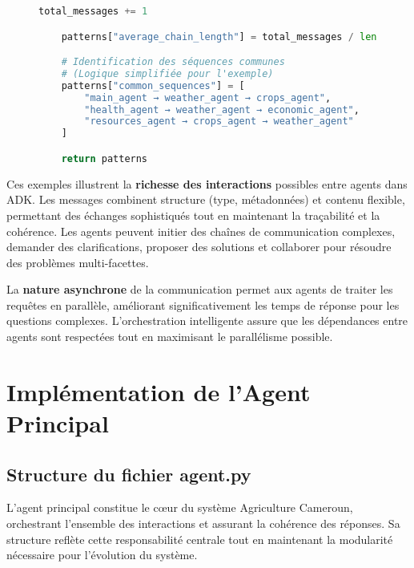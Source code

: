 \begin{figure}[H]
\begin{lstlisting}[language=Python, caption=Exemples de communications inter-agents en action]
            total_messages += 1

    patterns["average_chain_length"] = total_messages / len(scenarios)

    # Identification des séquences communes
    # (Logique simplifiée pour l'exemple)
    patterns["common_sequences"] = [
        "main_agent → weather_agent → crops_agent",
        "health_agent → weather_agent → economic_agent",
        "resources_agent → crops_agent → weather_agent"
    ]

    return patterns
\end{lstlisting}
\end{figure}

Ces exemples illustrent la \textbf{richesse des interactions} possibles entre agents dans ADK. Les messages combinent structure (type, métadonnées) et contenu flexible, permettant des échanges sophistiqués tout en maintenant la traçabilité et la cohérence. Les agents peuvent initier des chaînes de communication complexes, demander des clarifications, proposer des solutions et collaborer pour résoudre des problèmes multi-facettes.

La \textbf{nature asynchrone} de la communication permet aux agents de traiter les requêtes en parallèle, améliorant significativement les temps de réponse pour les questions complexes. L'orchestration intelligente assure que les dépendances entre agents sont respectées tout en maximisant le parallélisme possible.

\section{Implémentation de l'Agent Principal}

\subsection{Structure du fichier agent.py}

L'agent principal constitue le cœur du système Agriculture Cameroun, orchestrant l'ensemble des interactions et assurant la cohérence des réponses. Sa structure reflète cette responsabilité centrale tout en maintenant la modularité nécessaire pour l'évolution du système.

